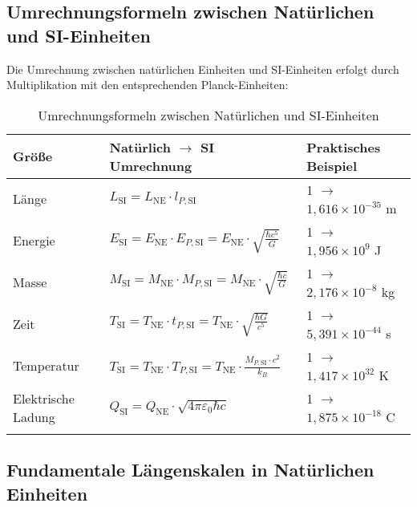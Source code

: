 \documentclass[12pt,a4paper]{article}
\begin{document}
	\subsection{Umrechnungsformeln zwischen Natürlichen und SI-Einheiten}
	
	Die Umrechnung zwischen natürlichen Einheiten und SI-Einheiten erfolgt durch Multiplikation mit den entsprechenden Planck-Einheiten:
	
	\begin{table}[ht]
		\centering
		\begin{adjustbox}{scale=1}
			\begin{tabular}{lll}
				\hline
				\textbf{Größe} & \textbf{Natürlich $\to$ SI Umrechnung} & \textbf{Praktisches Beispiel} \\
				\hline
				Länge & $L_{\text{SI}} = L_{\text{NE}} \cdot l_{P,\text{SI}}$ & 1 $\to$ $1,616 \times 10^{-35}$ m \\
				Energie & $E_{\text{SI}} = E_{\text{NE}} \cdot E_{P,\text{SI}} = E_{\text{NE}} \cdot \sqrt{\frac{\hbar c^5}{G}}$ & 1 $\to$ $1,956 \times 10^9$ J \\
				Masse & $M_{\text{SI}} = M_{\text{NE}} \cdot M_{P,\text{SI}} = M_{\text{NE}} \cdot \sqrt{\frac{\hbar c}{G}}$ & 1 $\to$ $2,176 \times 10^{-8}$ kg \\
				Zeit & $T_{\text{SI}} = T_{\text{NE}} \cdot t_{P,\text{SI}} = T_{\text{NE}} \cdot \sqrt{\frac{\hbar G}{c^5}}$ & 1 $\to$ $5,391 \times 10^{-44}$ s \\
				Temperatur & $T_{\text{SI}} = T_{\text{NE}} \cdot T_{P,\text{SI}} = T_{\text{NE}} \cdot \frac{M_{P,\text{SI}}\cdot c^2}{k_B}$ & 1 $\to$ $1,417 \times 10^{32}$ K \\
				Elektrische Ladung & $Q_{\text{SI}} = Q_{\text{NE}} \cdot \sqrt{4\pi\varepsilon_0\hbar c}$ & 1 $\to$ $1,875 \times 10^{-18}$ C \\
				\hline
				 \multicolumn{2}{c}{} \\
				\hline
			\end{tabular}
		\end{adjustbox}
		\caption{Umrechnungsformeln zwischen Natürlichen und SI-Einheiten }
		\label{tab:conversion}
	\end{table}
\subsection{Fundamentale Längenskalen in Natürlichen Einheiten}
\end{document}
